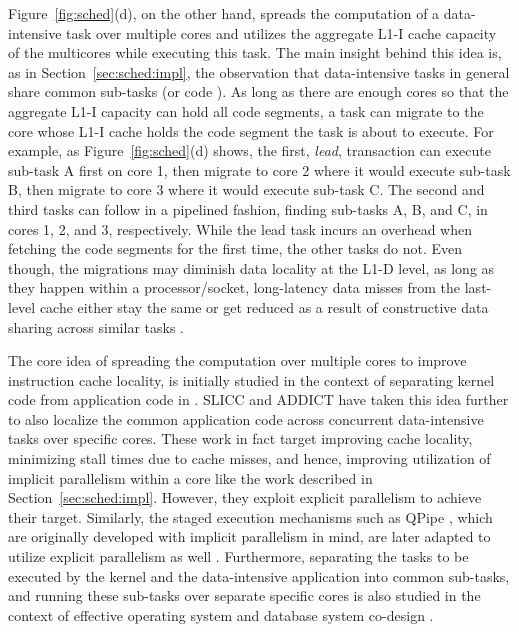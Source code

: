 \documentclass[11pt,dvipdfm]{article}
\newcommand{\reffig}[1]{Figure~\ref{fig:#1}}
\newcommand{\refsec}[1]{Section~\ref{sec:#1}}
\begin{document}
\reffig{sched}(d), on the other hand, 
spreads the computation of a data-intensive task over multiple cores and
utilizes the aggregate L1-I cache capacity of the multicores while executing this task.
The main insight behind this idea is, as in \refsec{sched:impl}, the observation that
data-intensive tasks in general share common sub-tasks (or code \cite{TozunAAM14}).
As long as there are enough cores so that the aggregate L1-I capacity can hold all code segments,
a task can migrate to the core whose L1-I cache holds the code segment the task is about to execute.
For example, as \reffig{sched}(d) shows,
the first, \emph{lead}, transaction can execute sub-task A first on core 1,
then migrate to core 2 where it would execute sub-task B,
then migrate to core 3 where it would execute sub-task C.
The second and third tasks can follow in a pipelined fashion,
finding sub-tasks A, B, and C, in cores 1, 2, and 3, respectively.
While the lead task incurs an overhead when fetching the code segments for the first time,
the other tasks do not.
Even though, the migrations may diminish data locality at the L1-D level,
as long as they happen within a processor/socket,
long-latency data misses from the last-level cache either stay the same
or get reduced as a result of constructive data sharing across similar tasks \cite{TozunAAM14}.

The core idea of spreading the computation over multiple cores to improve instruction cache locality,
is initially studied in the context of separating kernel code from application code in \cite{ChakrabortyWS06}.
SLICC \cite{AttaTAM12-2} and ADDICT \cite{TozunAAM14} have taken this idea further 
to also localize the common application code across concurrent data-intensive tasks over specific cores.
These work in fact target improving cache locality,
minimizing stall times due to cache misses,
and hence, improving utilization of implicit parallelism within a core
like the work described in \refsec{sched:impl}.
However, they exploit explicit parallelism to achieve their target.
Similarly, the staged execution mechanisms such as QPipe \cite{HarizopoulosSA05},
which are originally developed with implicit parallelism in mind,
are later adapted to utilize explicit parallelism as well \cite{GiannikisAK12, PsaroudakisAA13}.
Furthermore, separating the tasks to be executed by the kernel and the data-intensive application
into common sub-tasks, and running these sub-tasks over separate specific cores is also
studied in the context of effective operating system and database system co-design \cite{GicevaZAR16}.
\end{document}
